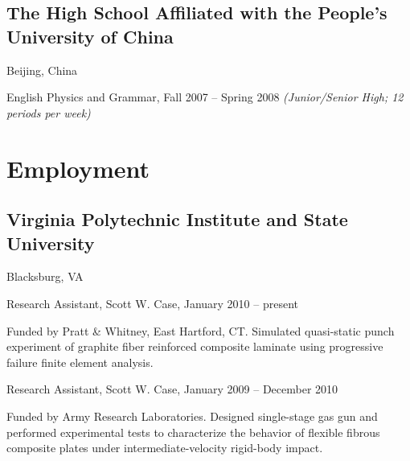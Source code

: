 \documentclass[10pt,letterpaper]{article}
\def\vpisu{Virginia Polytechnic Institute and State University}
\renewenvironment{itemize}{
  \begin{list}{}{
    \setlength{\leftmargin}{30pt}
    \setlength{\itemsep}{0.2em}
    \setlength{\parskip}{0pt}
    \setlength{\parsep}{0.25em}
  }
}{
  \end{list}
}
\begin{document}
\subsection*{The High School Affiliated with the People's University of China}
Beijing, China

\begin{itemize}
\item English Physics and Grammar, Fall 2007 -- Spring 2008
  \emph{(Junior/Senior High; 12 periods per week)}
\end{itemize}

\section*{Employment}

\titleformat{\subsection}[runin]{\large \it}{}{0pt}{}[\hfill\ ]

\subsection*{\vpisu}
Blacksburg, VA

\begin{itemize}
\item Research Assistant, Scott W. Case, January 2010 -- present
  \begin{itemize}
  \item Funded by Pratt \& Whitney, East Hartford, CT.  Simulated quasi-static
    punch experiment of graphite fiber reinforced composite laminate using
    progressive failure finite element analysis.
  \end{itemize}
\item Research Assistant, Scott W. Case, January 2009 -- December 2010
  \begin{itemize}
  \item Funded by Army Research Laboratories.  Designed single-stage gas gun and
    performed experimental tests to characterize the behavior of flexible
    fibrous composite plates under intermediate-velocity rigid-body impact.
  \end{itemize}
\end{itemize}
\end{document}
